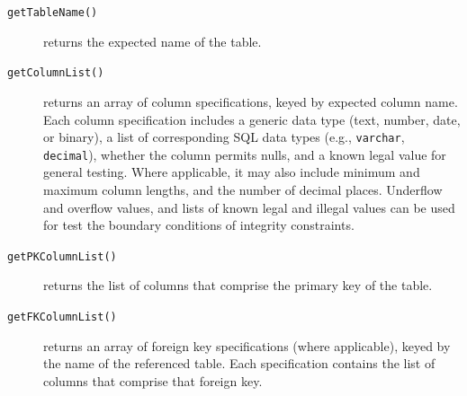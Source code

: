 \documentclass[sigconf, authordraft, capitalise]{acmart}
\begin{document}
\begin{description}
    \item[\texttt{getTableName()}] returns the expected name of the table.
    \item[\texttt{getColumnList()}] returns an array of column specifications, keyed by expected column name. Each column specification includes a generic data type (text, number, date, or binary), a list of corresponding SQL data types (e.g., \texttt{varchar}, \texttt{decimal}), whether the column permits nulls, and a known legal value for general testing. Where applicable, it may also include minimum and maximum column lengths, and the number of decimal places. Underflow and overflow values, and lists of known legal and illegal values can be used for test the boundary conditions of integrity constraints.
    \item[\texttt{getPKColumnList()}] returns the list of columns that comprise the primary key of the table.
    \item[\texttt{getFKColumnList()}] returns an array of foreign key specifications (where applicable), keyed by the name of the referenced table. Each specification contains the list of columns that comprise that foreign key. 
\end{description}

\end{document}
